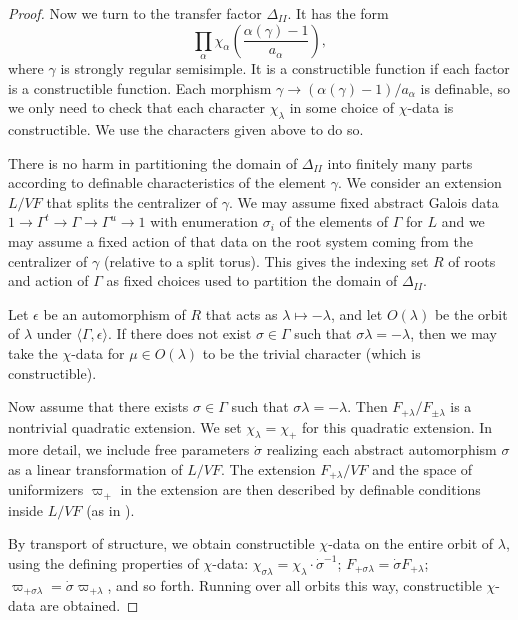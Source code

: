 \begin{proof}
Now we turn to the transfer factor $\Delta_{II}$.  It has the form
\[
\prod_\alpha \chi_\alpha
\left(\frac{\alpha(\gamma)-1}{a_\alpha}\right),
\]
where $\gamma$ is strongly regular semisimple.
It is a constructible function if each factor is a constructible
function. Each morphism $\gamma\to(\alpha(\gamma)-1)/a_\alpha$ is
definable, so we only need to check that each character $\chi_\lambda$
in some choice of $\chi$-data is constructible.  We use the characters
given above to do so.

There is no harm in partitioning the domain of $\Delta_{II}$ into
finitely many parts according to definable characteristics of the
element $\gamma$.  We consider an extension $L/VF$ that splits the
centralizer of $\gamma$.  We may assume fixed abstract Galois data
$1\to\Gamma^t\to\Gamma\to \Gamma^u\to 1$ with enumeration $\sigma_i$
of the elements of $\Gamma$ for $L$ and we may assume a fixed action
of that data on the root system coming from the centralizer of
$\gamma$ (relative to a split torus).  This gives the indexing set $R$
of roots and action of $\Gamma$ as fixed choices used to partition the
domain of $\Delta_{II}$.

Let $\epsilon$ be an automorphism of $R$ that acts as $\lambda\mapsto
-\lambda$, and let $O(\lambda)$ be the orbit of $\lambda$ under
$\langle\Gamma,\epsilon\rangle$.  If there does not exist
$\sigma\in\Gamma$ such that $\sigma\lambda=-\lambda$, then we may take
the $\chi$-data for $\mu\in O(\lambda)$ to be the trivial character
(which is constructible).

Now assume that there exists $\sigma\in\Gamma$ such that
$\sigma\lambda = -\lambda$.  Then $F_{+\lambda}/F_{\pm \lambda}$ is a
nontrivial quadratic extension.  We set $\chi_\lambda = \chi_+$ for
this quadratic extension.  In more detail, we include free parameters
$\dot\sigma$ realizing each abstract automorphism $\sigma$ as a linear
transformation of $L/VF$.  The extension $F_{+\lambda}/VF$ and the
space of uniformizers $\varpi_+$ in the extension are then described
by definable conditions inside $L/VF$ (as in
\cite{cluckers2011transfer}).

By transport of structure, we obtain constructible $\chi$-data on the
entire orbit of $\lambda$, using the defining properties of
$\chi$-data: $\chi_{\sigma\lambda} = \chi_{\lambda}\cdot
\dot\sigma^{-1}$; $F_{+\sigma\lambda}=\dot\sigma F_{+\lambda}$;
$\varpi_{+\sigma\lambda}=\dot\sigma\varpi_{+\lambda}$, and so forth.
Running over all orbits this way, constructible $\chi$-data are
obtained.
\end{proof}


